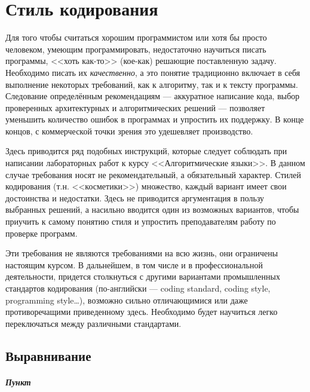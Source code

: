 \chapter{Стиль кодирования}

Для того чтобы считаться хорошим программистом или хотя бы просто
человеком, умеющим программировать, недостаточно научиться писать
программы, <<хоть как-то>> (кое-как) решающие поставленную задачу.
Необходимо писать их \emph{качественно}, а это понятие традиционно
включает в себя выполнение некоторых требований, как к алгоритму, так и
к тексту программы. Следование определённым рекомендациям --- аккуратное
написание кода, выбор проверенных архитектурных и алгоритмических
решений --- позволяет уменьшить количество ошибок в программах и
упростить их поддержку. В конце концов, с коммерческой точки зрения это
удешевляет производство.

Здесь приводится ряд подобных инструкций, которые следует соблюдать при
написании лабораторных работ к курсу <<Алгоритмические языки>>. В данном
случае требования носят не рекомендательный, а обязательный характер.
Стилей кодирования (т.н. <<косметики>>) множество, каждый вариант имеет
свои достоинства и недостатки. Здесь не приводится аргументация в пользу
выбранных решений, а насильно вводится один из возможных вариантов,
чтобы приучить к самому понятию стиля и упростить преподавателям работу
по проверке программ.

Эти требования не являются требованиями на всю жизнь, они ограничены
настоящим курсом. В дальнейшем, в том числе и в профессиональной
деятельности, придется столкнуться с другими вариантами промышленных
стандартов кодирования (по-английски --- coding standard, coding style,
programming style\ldots{}), возможно сильно отличающимися или даже
противоречащими приведенному здесь. Необходимо будет научиться легко
переключаться между различными стандартами.


\section{Выравнивание}


\paragraph{Пункт}

